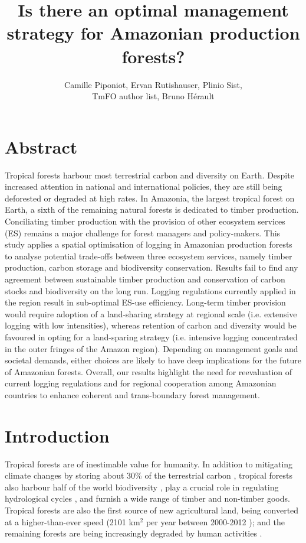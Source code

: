 \documentclass{article}
\title{Is there an optimal management strategy for Amazonian production forests?}
\author{Camille Piponiot, Ervan Rutishauser, Plinio Sist,\\ TmFO author list, Bruno Hérault}
\date{}
\begin{document}
\maketitle 

\section{Abstract}

Tropical forests harbour most terrestrial carbon and diversity on Earth. Despite increased attention in national and international policies, they are still being deforested or degraded at high rates. 
In Amazonia, the largest tropical forest on Earth, a sixth of the remaining natural forests is dedicated to timber production. Conciliating timber production with the provision of other ecosystem services (ES) remains a major challenge for forest managers and policy-makers. This study applies a spatial optimisation of logging in Amazonian production forests to analyse potential trade-offs between three ecosystem services, namely timber production, carbon storage and biodiversity conservation.  
Results fail to find any agreement between sustainable timber production and conservation of carbon stocks and biodiversity on the long run. Logging regulations currently applied in the region result in sub-optimal ES-use efficiency. Long-term timber provision would require adoption of a land-sharing strategy at regional scale (i.e. extensive logging with low intensities), whereas retention of carbon and diversity would be favoured in opting for a land-sparing strategy (i.e. intensive logging concentrated in the outer fringes of the Amazon region). Depending on management goals and societal demands, either choices are likely to have deep implications for the future of Amazonian forests. Overall, our results highlight the need for reevaluation of current logging regulations and for regional cooperation among Amazonian countries to enhance coherent and trans-boundary forest management.

\twocolumn

\section{Introduction}


Tropical forests are of inestimable value for humanity. In addition to mitigating climate changes by storing about 30\% of the terrestrial carbon \cite{Pan2013}, tropical forests also harbour half of the world biodiversity \cite{Pimm2014}, play a crucial role in regulating hydrological cycles \cite{Fisher2009a}, and furnish a wide range of timber and non-timber goods. Tropical forests are also the first source of new agricultural land, being converted at a higher-than-ever speed (2101 km$^2$ per year between 2000-2012 \cite{Hansen2013}); and the remaining forests are being increasingly degraded by human activities \cite{Potapov2017}. 
\end{document}
